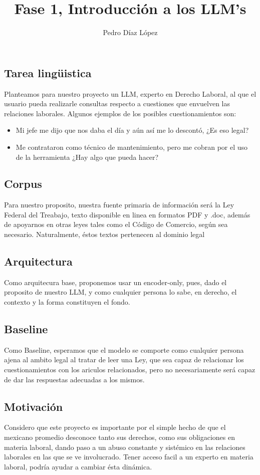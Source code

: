 \documentclass[10pt]{article}
\author{Pedro D\'{i}az L\'{o}pez}
\title{Fase 1, Introducci\'{o}n a los LLM's}
\begin{document}
\maketitle

\subsection{Tarea lingüistica}
\normalsize{Planteamos} para nuestro proyecto un LLM, experto en Derecho Laboral, al que el usuario
pueda realizarle consultas respecto a cuestiones que envuelven las relaciones laborales.
Algunos ejemplos de los posibles cuestionamientos son:
\begin{itemize}
\item Mi jefe me dijo que nos daba el d\'{i}a y a\'{u}n as\'{i} me lo descont\'{o}, ¿Es
eso legal?
\item Me contrataron como t\'{e}cnico de mantenimiento, pero me cobran por el uso de la herramienta
¿Hay algo que pueda hacer?
\end{itemize}

\subsection{Corpus}
Para nuestro proposito, nuestra fuente primaria de informaci\'{o}n ser\'{a} la Ley Federal del
Treabajo, texto disponible en linea en formatos PDF y .doc, además de apoyarnos en otras leyes
tales como el C\'{o}digo de Comercio, seg\'{u}n sea necesario. Naturalmente, \'{e}stos textos
pertenecen al dominio legal 
\subsection{Arquitectura}
Como arquitecura base, proponemos usar un encoder-only, pues, dado el proposito de nuestro LLM,
y como cualquier persona lo sabe, en derecho, el contexto y la forma constituyen el fondo.
\subsection{Baseline}
Como Baseline, esperamos que el modelo se comporte como cualquier persona ajena al ambito
legal al tratar de leer una Ley, que sea capaz de relacionar los cuestionamientos con los
ariculos relacionados, pero no necesariamente será capaz de dar las respuestas adecuadas a los mismos.
\subsection{Motivaci\'{o}n}
Considero que este proyecto es importante por el simple hecho de que el mexicano promedio desconoce
tanto sus derechos, como sus obligaciones en materia laboral, dando paso a un abuso constante
y sist\'{e}mico en las relaciones laborales en las que se ve involucrado. Tener acceso facil
a un experto en materia laboral, podr\'{i}a ayudar a cambiar \'{e}sta din\'{a}mica.	
\end{document}
